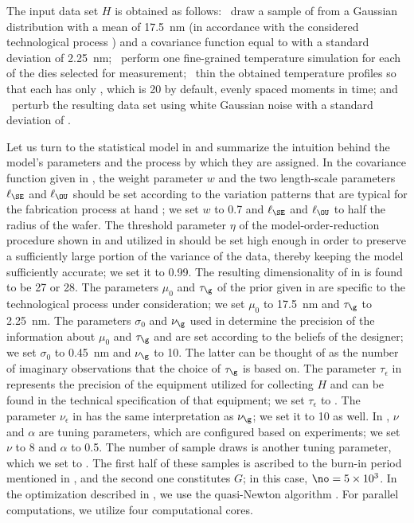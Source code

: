 The input data set $H$ is obtained as follows: \one~draw a sample of \g from a
Gaussian distribution with a mean of 17.5~nm (in accordance with the considered
technological process \cite{ptm}) and a covariance function equal to
 with a standard deviation of 2.25~nm; \two~perform one
fine-grained temperature simulation for each of the \hnd dies selected for
measurement; \three~thin the obtained temperature profiles so that each has only
\ns, which is 20 by default, evenly spaced moments in time; and \four~perturb
the resulting data set using white Gaussian noise with a standard deviation of
.

Let us turn to the statistical model in  and
summarize the intuition behind the model's parameters and the process by which
they are assigned. In the covariance function given in ,
the weight parameter $w$ and the two length-scale parameters $\ell_\SE$ and
$\ell_\OU$ should be set according to the variation patterns that are typical
for the fabrication process at hand \cite{chandrakasan2000, cheng2011}; we set
$w$ to 0.7 and $\ell_\SE$ and $\ell_\OU$ to half the radius of the wafer. The
threshold parameter $\eta$ of the model-order-reduction procedure shown in
 and utilized in  should be set high
enough in order to preserve a sufficiently large portion of the variance of the
data, thereby keeping the model sufficiently accurate; we set it to 0.99. The
resulting dimensionality \nz of \vz in  is found to be 27
or 28. The parameters $\mu_0$ and $\tau_\g$ of the prior given in
 are specific to the technological process under
consideration; we set $\mu_0$ to 17.5~nm and $\tau_\g$ to 2.25~nm. The
parameters $\sigma_0$ and $\nu_\g$ used in  determine the
precision of the information about $\mu_0$ and $\tau_\g$ and are set according
to the beliefs of the designer; we set $\sigma_0$ to 0.45~nm and $\nu_\g$ to 10.
The latter can be thought of as the number of imaginary observations that the
choice of $\tau_\g$ is based on. The parameter $\tau_\epsilon$ in
 represents the precision of the equipment utilized for
collecting $H$ and can be found in the technical specification of that
equipment; we set $\tau_\epsilon$ to . The parameter $\nu_\epsilon$
in  has the same interpretation as $\nu_\g$; we set it to 10
as well. In , $\nu$ and $\alpha$ are tuning parameters,
which are configured based on experiments; we set $\nu$ to 8 and $\alpha$ to
0.5. The number of sample draws is another tuning parameter, which we set to
. The first half of these samples is ascribed to the burn-in period
mentioned in , and the second one constitutes $G$; in
this case, $\no = 5 \times 10^3$. In the optimization described in
, we use the quasi-Newton algorithm \cite{press2007}.
For parallel computations, we utilize four computational cores.


